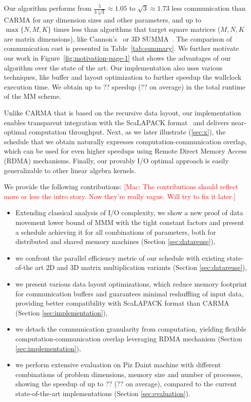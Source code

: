 \documentclass[sigplan,review,anonymous]{acmart}\settopmatter{printfolios=true,printccs=false,printacmref=false}
\newcommand\mac[1]{\textcolor{red}{[Mac: #1]}}
\begin{document}
Our algorithm performs from $\frac{5}{3 \sqrt[3]{4}} \approx 1.05$ to $\sqrt{3} 
\approx 1.73$ less
communication than CARMA for any dimension sizes and other parameters, and up
to $\max\{N,M,K\}$ times less than algorithms that target square matrices ($M,
N, K$ are matrix dimensions), like Cannon's~\cite{generalCannon} or 3D
SUMMA~\cite{summa}. The comparison of communication cost is presented in
Table~\ref{tab:summary}. 
%
We further motivate our work in Figure~\ref{fig:motivation-page-1} that
shows the advantages of our algorithm over the state of the art. Our 
implementation also uses various techniques, like buffer and layout 
optimization to further speedup the wallclock execution 
time. We
obtain up to ?? speedup (?? on average) in the total runtime of the MM scheme.

Unlike CARMA that is based on the recursive data layout, our implementation
enables transparent integration with the ScaLAPACK format~\cite{cite} and
delivers near-optimal computation throughput.
%
Next, as we later illustrate (\cref{sec:x}), the schedule that we obtain
naturally expresses computation-communication overlap, which can be
used for even higher speedups using Remote Direct Memory Access (RDMA)
mechanisms.
%
Finally, our provably I/O optimal approach is easily generalizable to other
linear algebra kernels. 

We provide the following contributions:
\mac{The contributions should reflect more or less the intro story.
Now they're really vague. Will try to fix it later.}

\begin{itemize}[leftmargin=1em]
%
\item Extending classical analysis of I/O complexity, we show a new proof of  
data movement lower bound of MMM with the tight constant factors and present a 
schedule 
achieving it for all combinations of parameters, both for distributed and 
shared memory machines (Section \ref{sec:datareuse}),
%
\item we confront the parallel efficiency metric of our schedule with 
existing state-of-the art 2D and 3D matrix multiplication variants 
(Section \ref{sec:datareuse}),
%
\item we present various data layout optimizations, which reduce memory 
footprint for communication buffers and guarantees minimal reshuffling 
of input data, providing better compatibility with ScaLAPACK format 
than CARMA (Section \ref{sec:implementation}),
%
\item we detach the communication granularity from computation, 
yielding flexible computation-communication overlap leveraging RDMA 
mechanism (Section \ref{sec:implementation}),
%
\item we perform extensive evaluation on Piz Daint
machine with different combinations of problem dimensions, memory size 
and number of processes, showing the speedup of up to ?? (?? on average), 
compared to the current state-of-the-art implementations
(Section \ref{sec:evaluation}).
%
\end{itemize}
\end{document}
